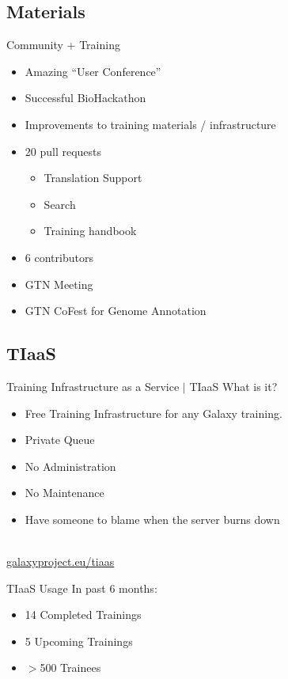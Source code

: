 \documentclass[12pt]{euslides}
\begin{document}
\subsection{Materials}
\begin{frame}{Community + Training}
	\begin{itemize}
		\item Amazing ``User Conference''
		\item Successful BioHackathon
		\item Improvements to training materials / infrastructure
		\item 20 pull requests
		\begin{itemize}
			\item Translation Support
			\item Search
			\item Training handbook
		\end{itemize}
		\item 6 contributors
		\item GTN Meeting
		\item GTN CoFest for Genome Annotation
	\end{itemize}
\end{frame}


\subsection{TIaaS}
\begin{frame}{Training Infrastructure as a Service $|$ TIaaS}
	What is it?
	\begin{itemize}
		\item Free Training Infrastructure for any Galaxy training.
		\item Private Queue
		\item No Administration
		\item No Maintenance
		\item Have someone to blame when the server burns down
	\end{itemize}
	\ \\
	\url{galaxyproject.eu/tiaas}
\end{frame}

{%
	\begin{frame}[plain]
	\end{frame}
}

\begin{frame}{TIaaS Usage}
	In past 6 months:
	\begin{itemize}
		\item 14 Completed Trainings
		\item 5 Upcoming Trainings
		\item $>$500 Trainees
	\end{itemize}
\end{frame}
\end{document}
